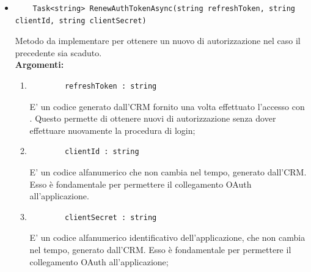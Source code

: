 \begin{itemize}
	\item 
	\begin{lstlisting}
	Task<string> RenewAuthTokenAsync(string refreshToken, string clientId, string clientSecret)
	\end{lstlisting}
	Metodo da implementare per ottenere un nuovo  di autorizzazione nel caso il precedente sia scaduto.\\
	\textbf{\small Argomenti:}
	\begin{enumerate}[leftmargin=*]
		\itemsep0em
		\item 
		\begin{lstlisting}
		refreshToken : string
		\end{lstlisting}
		E' un codice generato dall'CRM fornito una volta effettuato l'accesso con . Questo permette di ottenere nuovi  di autorizzazione senza dover effettuare nuovamente la procedura di login;
		\item 
		\begin{lstlisting}
		clientId : string
		\end{lstlisting}
		E' un codice alfanumerico che non cambia nel tempo, generato dall'CRM. Esso è fondamentale per permettere il collegamento OAuth all'applicazione. 
		\item 
		\begin{lstlisting}
		clientSecret : string
		\end{lstlisting}
		E' un codice alfanumerico identificativo dell'applicazione, che non cambia nel tempo, generato dall'CRM. Esso è fondamentale per permettere il collegamento OAuth all'applicazione; 
	\end{enumerate}


\end{itemize}
